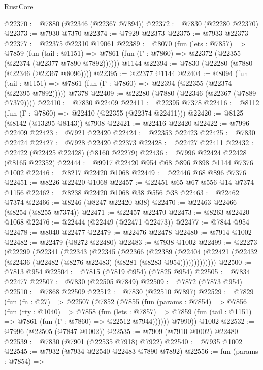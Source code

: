 \begin{lexlean}{RustCore}
\begin{coremodule}
@22370 := @7880 (@22346 (@22367 @7894))
@22372 := @7830 (@22280 @22370)
@22373 := @7930 @7370
@22374 := @7929 @22373
@22375 := @7933 @22373
@22377 := @22375 @22310 @19061
@22389 := @8070
    (fun (lets : @7857) =>
    @7859
      (fun (tail : @1151) =>
      @7861 (fun (Γ : @7860) => @22372 (@22355 (@22374 (@22377 @7890 @7892))))))
    @1144
@22394 := @7830 (@22280 (@7880 (@22346 (@22367 @8096))))
@22395 := @22377 @1144
@22404 := @8094
    (fun (tail : @1151) => @7861 (fun (Γ : @7860) => @22394 (@22355 (@22374 (@22395 @7892)))))
    @7378
@22409 := @22280 (@7880 (@22346 (@22367 (@7889 @7379))))
@22410 := @7830 @22409
@22411 := @22395 @7378
@22416 := @8112 (fun (Γ : @7860) => @22410 (@22355 (@22374 @22411)))
@22420 := @8125 (@8142 (@13295 @8143)) @7908
@22421 := @22416 @22420
@22422 := @7996 @22409
@22423 := @7921 @22420
@22424 := @22353 @22423
@22425 := @7830 @22424
@22427 := @7928 @22420 @22373
@22428 := @22427 @22411
@22432 := @22422 (@22425 @22428) (@8160 @22279)
@22436 := @7996 @22424 @22428 (@8165 @22352)
@22444 := @9917 @22420 @954 @68 @896 @898 @1144 @7376 @1002
@22446 := @8217 @22420 @1068
@22449 := @22446 @68 @896 @7376
@22451 := @8226 @22420 @1068
@22457 := @22451 @65 @67 @556 @14 @7374 @1156
@22462 := @8238 @22420 @1068 @38 @556 @38
@22463 := @22462 @7374
@22466 := @8246 (@8247 @22420 @38)
@22470 := @22463 @22466 (@8254 (@8255 @7374))
@22471 := @22457 @22470
@22473 := @8263 @22420 @1068
@22476 := @22444 (@22449 (@22471 @22473))
@22477 := @7844 @954
@22478 := @8040 @22477
@22479 := @22476 @22478
@22480 := @7914 @1002
@22482 := @22479 (@8272 @22480)
@22483 := @7938 @1002
@22499 := @22273
    (@22299
      (@22341
        (@22343
          (@22345
            (@22366
              (@22389
                (@22404
                  (@22421 (@22432 (@22436 (@22482 (@8276 @22483) (@8281 (@8283 @954)))))))))))))
@22500 := @7813 @954
@22504 := @7815 (@7819 @954) (@7825 @954)
@22505 := @7834 @22477
@22507 := @7830 (@22505 @7849)
@22509 := @7872 (@7873 @954)
@22510 := @7868 @22509
@22512 := @7830 (@22510 @7897)
@22529 := @7829
    (fun (fn : @27) =>
    @22507
      (@7852
        (@7855
          (fun (params : @7854) =>
          @7856
            (fun (rty : @1040) =>
            @7858
              (fun (lets : @7857) =>
              @7859 (fun (tail : @1151) => @7861 (fun (Γ : @7860) => @22512 @7944))))))
        @7990))
    @1002
@22532 := @7996 (@22505 (@7847 @1002))
@22535 := @7909 (@7910 @1002) @22480
@22539 := @7830 (@7901 (@22535 @7918) @7922)
@22540 := @7935 @1002
@22545 := @7932 (@7934 @22540 @22483 @7890 @7892)
@22556 := fun (params : @7854) =>

\end{coremodule}
\end{lexlean}
